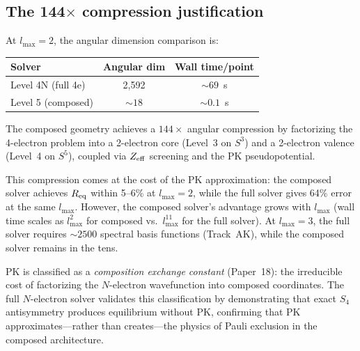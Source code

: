 \documentclass[aps,pra,twocolumn,superscriptaddress,longbibliography,floatfix]{revtex4-2}
\begin{document}
\subsection{The 144$\times$ compression justification}

At $l_{\max} = 2$, the angular dimension comparison is:
\begin{center}
\begin{tabular}{lcc}
\toprule
Solver & Angular dim & Wall time/point \\
\midrule
Level 4N (full 4e) & 2,592 & ${\sim}69$~s \\
Level 5 (composed) & ${\sim}18$ & ${\sim}0.1$~s \\
\bottomrule
\end{tabular}
\end{center}
The composed geometry achieves a $144{\times}$ angular compression
by factorizing the 4-electron problem into a 2-electron core (Level~3
on $S^3$) and a 2-electron valence (Level~4 on $S^5$), coupled via
$Z_{\rm eff}$ screening and the PK pseudopotential.

This compression comes at the cost of the PK approximation: the
composed solver achieves $R_{\rm eq}$ within 5--6\% at $l_{\max} = 2$,
while the full solver gives 64\% error at the same $l_{\max}$.
However, the composed solver's advantage grows with $l_{\max}$
(wall time scales as $l_{\max}^2$ for composed vs.\ $l_{\max}^{11}$
for the full solver).  At $l_{\max} = 3$, the full solver requires
${\sim}2500$ spectral basis functions (Track~AK), while the composed
solver remains in the tens.

PK is classified as a \emph{composition exchange constant}
(Paper~18): the irreducible cost of factorizing the $N$-electron
wavefunction into composed coordinates.  The full $N$-electron solver
validates this classification by demonstrating that exact $S_4$
antisymmetry produces equilibrium without PK, confirming that PK
approximates---rather than creates---the physics of Pauli exclusion
in the composed architecture.
\end{document}
